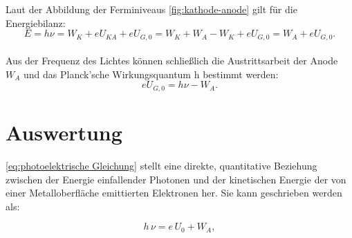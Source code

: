Laut der Abbildung der Ferminiveaus \ref{fig:kathode-anode} 
gilt für die Energiebilanz:
\begin{equation}
    E = h\nu = W_K + eU_{KA} + eU_{G,0} 
    = W_K + W_A - W_K + eU_{G,0} 
    = W_A + eU_{G,0}.
\end{equation}\\
Aus der Frequenz des Lichtes können 
schließlich
die Austrittsarbeit der Anode $W_A$ und 
das Planck’sche Wirkungsquantum h bestimmt 
werden:
\begin{equation}
    eU_{G,0} = h\nu - W_A.
    \label{eq:photoelektrische Gleichung}
\end{equation}


\section{Auswertung}
\cref{eq:photoelektrische Gleichung} stellt eine direkte, quantitative Beziehung zwischen der Energie einfallender Photonen und der kinetischen Energie der von einer Metalloberfläche emittierten Elektronen her. Sie kann geschrieben werden als:

\begin{equation}
    h\,\nu = e\,U_{0} + W_{A},
\end{equation}

